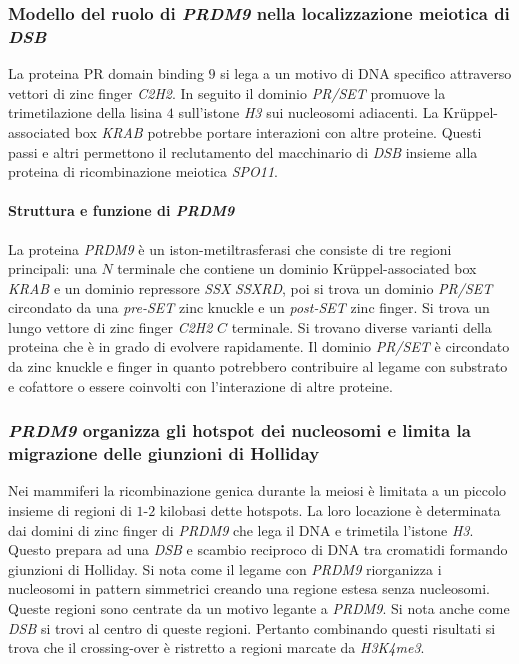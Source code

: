 \subsubsection{Modello del ruolo di \emph{PRDM9} nella localizzazione meiotica di \emph{DSB}}
La proteina PR domain binding $9$ si lega a un motivo di DNA specifico attraverso vettori di zinc finger \emph{C2H2}. In seguito il dominio \emph{PR/SET} promuove la trimetilazione 
della lisina $4$ sull'istone \emph{H3} sui nucleosomi adiacenti. La Kr\"uppel-associated box \emph{KRAB} potrebbe portare interazioni con altre proteine. Questi passi e altri permettono
il reclutamento del macchinario di \emph{DSB} insieme alla proteina di ricombinazione meiotica \emph{SPO11}.
\paragraph{Struttura e funzione di \emph{PRDM9}}
La proteina \emph{PRDM9} \`e un iston-metiltrasferasi che consiste di tre regioni principali: una $N$ terminale che contiene un dominio Kr\"uppel-associated box \emph{KRAB} e un dominio
repressore \emph{SSX} \emph{SSXRD}, poi si trova un dominio \emph{PR/SET} circondato da una \emph{pre-SET} zinc knuckle e un \emph{post-SET} zinc finger. Si trova un lungo vettore di 
zinc finger \emph{C2H2} $C$ terminale. Si trovano diverse varianti della proteina che \`e in grado di evolvere rapidamente. Il dominio \emph{PR/SET} \`e circondato da zinc knuckle e 
finger in quanto potrebbero contribuire al legame con substrato e cofattore o essere coinvolti con l'interazione di altre proteine. 
\subsubsection{\emph{PRDM9} organizza gli hotspot dei nucleosomi e limita la migrazione delle giunzioni di Holliday}
Nei mammiferi la ricombinazione genica durante la meiosi \`e limitata a un piccolo insieme di regioni di $1$-$2$ kilobasi dette hotspots. La loro locazione \`e determinata dai domini 
di zinc finger di \emph{PRDM9} che lega il DNA e trimetila l'istone \emph{H3}. Questo prepara ad una \emph{DSB} e scambio reciproco di DNA tra cromatidi formando giunzioni di Holliday. 
Si nota come il legame con \emph{PRDM9} riorganizza i nucleosomi in pattern simmetrici creando una regione estesa senza nucleosomi. Queste regioni sono centrate da un motivo legante a
\emph{PRDM9}. Si nota anche come \emph{DSB} si trovi al centro di queste regioni. Pertanto combinando questi risultati si trova che il crossing-over \`e ristretto a regioni marcate 
da \emph{H3K4me3}.
